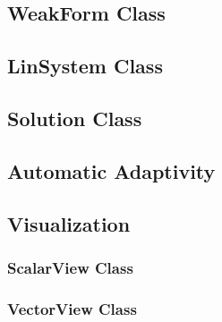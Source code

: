 \subsection{WeakForm Class}
\label{sec:weakform}



\subsection{LinSystem Class}


\label{sec:multimesh}



\subsection{Solution Class}
\label{sec:solution}



\subsection{Automatic Adaptivity}
\label{sec:h1adapt}


\label{sec:calc_energy_norm}



\subsection{Visualization}

\subsubsection{ScalarView Class}

\subsubsection{VectorView Class}

